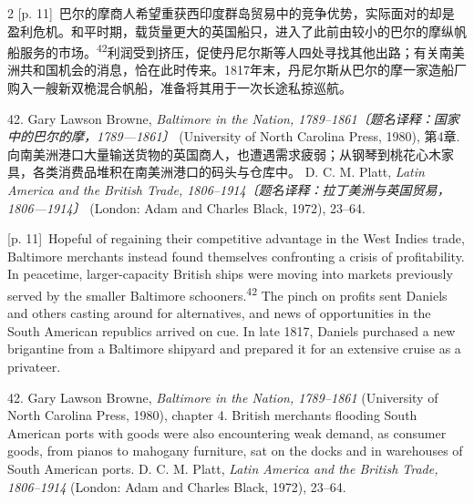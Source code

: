 \documentclass[10pt,a4paper]{article}
\begin{document}
\begin{paracol}{2}
{\scriptsize\color{gray} [p. 11]}\ 巴尔的摩商人希望重获西印度群岛贸易中的竞争优势，实际面对的却是盈利危机。和平时期，载货量更大的英国船只，进入了此前由较小的巴尔的摩纵帆船服务的市\mbox{场。\textsuperscript{42}}利润受到挤压，促使丹尼尔斯等人四处寻找其他出路；有关南美洲共和国机会的消息，恰在此时传来。1817年末，丹尼尔斯从巴尔的摩一家造船厂购入一艘新双桅混合帆船，准备将其用于一次长途私掠巡航。\par{\small 42. Gary Lawson Browne, \textit{Baltimore in the Nation, 1789–1861〔题名译释：国家中的巴尔的摩，1789—1861〕} (University of North Carolina Press, 1980), 第4章. 向南美洲港口大量输送货物的英国商人，也遭遇需求疲弱；从钢琴到桃花心木家具，各类消费品堆积在南美洲港口的码头与仓库中。 D. C. M. Platt, \textit{Latin America and the British Trade, 1806–1914〔题名译释：拉丁美洲与英国贸易，1806—1914〕} (London: Adam and Charles Black, 1972), 23–64.\par}
\switchcolumn
{\scriptsize\color{gray} [p. 11]}\ Hopeful of regaining their competitive advantage in the West Indies trade, Baltimore merchants instead found themselves confronting a crisis of profitability. In peacetime, larger-capacity British ships were moving into markets previously served by the smaller Baltimore schooners.\nobreak\textsuperscript{42} The pinch on profits sent Daniels and others casting around for alternatives, and news of opportunities in the South American republics arrived on cue. In late 1817, Daniels purchased a new brigantine from a Baltimore shipyard and prepared it for an extensive cruise as a privateer.\par{\small 42. Gary Lawson Browne, \textit{Baltimore in the Nation, 1789–1861} (University of North Carolina Press, 1980), chapter 4. British merchants flooding South American ports with goods were also encountering weak demand, as consumer goods, from pianos to mahogany furniture, sat on the docks and in warehouses of South American ports. D. C. M. Platt, \textit{Latin America and the British Trade, 1806–1914} (London: Adam and Charles Black, 1972), 23–64.\par}
\switchcolumn*

\end{paracol}
\end{document}
